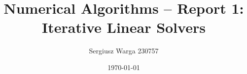 \documentclass[a4paper]{article}
\title{Numerical Algorithms – Report 1: Iterative Linear Solvers}
\author{Sergiusz Warga 230757}
\date{\today}
\begin{document}
\maketitle
\tableofcontents
\pagebreak
\end{document}
